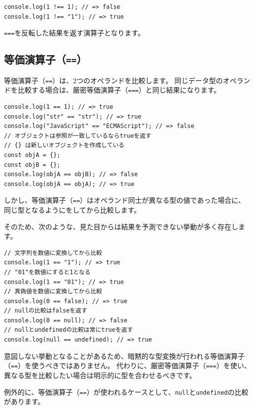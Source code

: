 \begin{lstlisting}
console.log(1 !== 1); // => false
console.log(1 !== "1"); // => true
\end{lstlisting}

\texttt{===}を反転した結果を返す演算子となります。

\hypertarget{equal-operator}{%
\subsection{\texorpdfstring{等価演算子（\texttt{==}）}{等価演算子（==）}}\label{equal-operator}}

等価演算子（\texttt{==}）は、2つのオペランドを比較します。
同じデータ型のオペランドを比較する場合は、厳密等価演算子（\texttt{===}）と同じ結果になります。

\begin{lstlisting}
console.log(1 == 1); // => true
console.log("str" == "str"); // => true
console.log("JavaScript" == "ECMAScript"); // => false
// オブジェクトは参照が一致しているならtrueを返す
// {} は新しいオブジェクトを作成している
const objA = {};
const objB = {};
console.log(objA == objB); // => false
console.log(objA == objA); // => true
\end{lstlisting}

しかし、等価演算子（\texttt{==}）はオペランド同士が異なる型の値であった場合に、
同じ型となるように\textbf{}をしてから比較します。

そのため、次のような、見た目からは結果を予測できない挙動が多く存在します。

\begin{lstlisting}
// 文字列を数値に変換してから比較
console.log(1 == "1"); // => true
// "01"を数値にすると1となる
console.log(1 == "01"); // => true
// 真偽値を数値に変換してから比較
console.log(0 == false); // => true
// nullの比較はfalseを返す
console.log(0 == null); // => false
// nullとundefinedの比較は常にtrueを返す
console.log(null == undefined); // => true
\end{lstlisting}

意図しない挙動となることがあるため、暗黙的な型変換が行われる等価演算子（\texttt{==}）を使うべきではありません。
\enlargethispage{\baselineskip}代わりに、厳密等価演算子（\texttt{===}）を使い、異なる型を比較したい場合は明示的に型を合わせるべきです。

例外的に、等価演算子（\texttt{==}）が使われるケースとして、\texttt{null}と\texttt{undefined}の比較があります。

